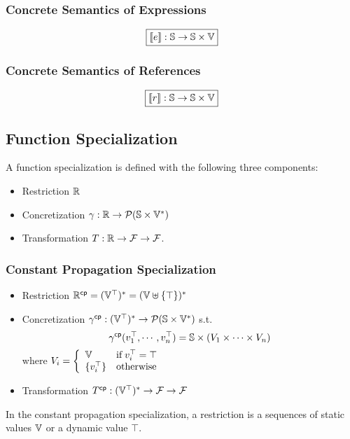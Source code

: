 \subsubsection{Concrete Semantics of Expressions}

\[
  \framebox{$\sem{\expr}: \stset \rightarrow \stset \times \valset$}
\]

\todo



\subsubsection{Concrete Semantics of References}

\[
  \framebox{$\sem{\refer}: \stset \rightarrow \stset \times \valset$}
\]

\todo





\subsection{Function Specialization}

\todo

A function specialization is defined with the following three components:
\begin{itemize}
  \item Restriction $\mathbb{R}$
  \item Concretization $\gamma: \mathbb{R} \rightarrow \mathcal{P}(\mathbb{S}
    \times \mathbb{V}^*)$
  \item Transformation $T: \mathbb{R} \rightarrow \mathcal{F} \rightarrow
    \mathcal{F}$.
\end{itemize}

\todo



\subsubsection{Constant Propagation Specialization}
\begin{itemize}
  \item Restriction $\mathbb{R}^{\textsf{cp}} = (\mathbb{V}^\top)^* =
    (\mathbb{V} \uplus \{ \top \})^*$
  \item Concretization $\gamma^{\textsf{cp}}: (\mathbb{V}^\top)^* \rightarrow \mathcal{P}(\mathbb{S}
    \times \mathbb{V}^*)$ s.t.
    \[
      \gamma^{\textsf{cp}}(v^\top_1, \cdots, v^\top_n) = \mathbb{S} \times (V_1 \times \cdots
      \times V_n)
    \]
    where $V_i = \left\{
      \begin{array}{ll}
        \mathbb{V} & \text{if} \; v^\top_i = \top\\
        \{ v^\top_i \} & \text{otherwise}\\
      \end{array}
    \right.$
  \item Transformation $T^{\textsf{cp}}: (\mathbb{V}^\top)^* \rightarrow \mathcal{F}
    \rightarrow \mathcal{F}$
\end{itemize}
In the constant propagation specialization, a restriction is a sequences of
static values $\mathbb{V}$ or a dynamic value $\top$.

